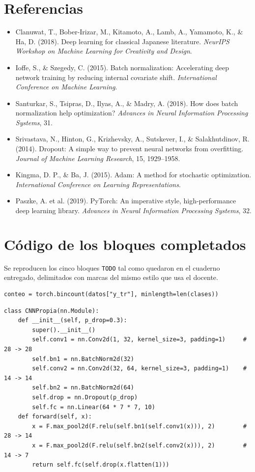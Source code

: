 \documentclass[11pt,letterpaper]{article}
\begin{document}
\section{Referencias}
\begin{itemize}
    \item Clanuwat, T., Bober-Irizar, M., Kitamoto, A., Lamb, A., Yamamoto, K., \& Ha, D. (2018). Deep learning for classical Japanese literature. \textit{NeurIPS Workshop on Machine Learning for Creativity and Design}.
    \item Ioffe, S., \& Szegedy, C. (2015). Batch normalization: Accelerating deep network training by reducing internal covariate shift. \textit{International Conference on Machine Learning}.
    \item Santurkar, S., Tsipras, D., Ilyas, A., \& Madry, A. (2018). How does batch normalization help optimization? \textit{Advances in Neural Information Processing Systems}, 31.
    \item Srivastava, N., Hinton, G., Krizhevsky, A., Sutskever, I., \& Salakhutdinov, R. (2014). Dropout: A simple way to prevent neural networks from overfitting. \textit{Journal of Machine Learning Research}, 15, 1929--1958.
    \item Kingma, D. P., \& Ba, J. (2015). Adam: A method for stochastic optimization. \textit{International Conference on Learning Representations}.
    \item Paszke, A. et al. (2019). PyTorch: An imperative style, high-performance deep learning library. \textit{Advances in Neural Information Processing Systems}, 32.
\end{itemize}

\appendix
\section{Código de los bloques completados}
\label{anexo:codigo}

Se reproducen los cinco bloques \texttt{TODO} tal como quedaron en el cuaderno entregado, delimitados con marcas del mismo estilo que usa el docente.

\begin{lstlisting}[caption={TODO 1, imágenes por clase}]
conteo = torch.bincount(datos["y_tr"], minlength=len(clases))
\end{lstlisting}

\begin{lstlisting}[caption={TODO 2, arquitectura}]
class CNNPropia(nn.Module):
    def __init__(self, p_drop=0.3):
        super().__init__()
        self.conv1 = nn.Conv2d(1, 32, kernel_size=3, padding=1)     # 28 -> 28
        self.bn1 = nn.BatchNorm2d(32)
        self.conv2 = nn.Conv2d(32, 64, kernel_size=3, padding=1)    # 14 -> 14
        self.bn2 = nn.BatchNorm2d(64)
        self.drop = nn.Dropout(p_drop)
        self.fc = nn.Linear(64 * 7 * 7, 10)
    def forward(self, x):
        x = F.max_pool2d(F.relu(self.bn1(self.conv1(x))), 2)        # 28 -> 14
        x = F.max_pool2d(F.relu(self.bn2(self.conv2(x))), 2)        # 14 -> 7
        return self.fc(self.drop(x.flatten(1)))
\end{lstlisting}
\end{document}
